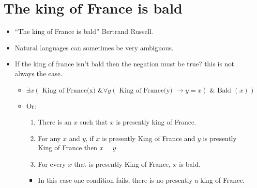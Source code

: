 \section{The king of France is bald}
\begin{itemize}
    \item ``The king of France is bald'' Bertrand Russell.
    \item Natural languages can sometimes be very ambiguous.
    \item If the king of france isn't bald then the negation must be true? this is not always the case.
        \begin{itemize}
            \item \[
              \exists x ( \text{ King of France(x) \&} \forall y(\text{ King of France(y) } \rightarrow y=x) \text{ \& } 
              \text{ Bald }(x)
              )
            \]
            
            \item Or:
                \begin{enumerate}
                    \item There is an $x$ such that $x$ is presently king of France.
                    \item For any $x$ and $y$, if $x$ is presently King of France and $y$ is presently King of France then $x=y$ 
                    \item For every $x$ that is presently King of France, $x$ is bald.
                \end{enumerate}
                \begin{itemize}[label=\#]
                    \item In this case one condition fails, there is no presently a king of France.
                \end{itemize}
        \end{itemize}
\end{itemize}


